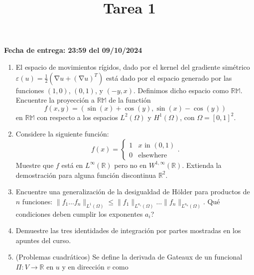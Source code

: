 \documentclass{article}
\title{Tarea 1}
\date{}
\DeclareMathOperator{\grad}{\nabla}
\newcommand{\R}{\mathbb{R}}
\begin{document}
\maketitle
\hfill \textbf{Fecha de entrega: 23:59 del 09/10/2024}
 

\begin{enumerate}
    \item El espacio de movimientos rígidos, dado por el kernel del gradiente simétrico $\varepsilon(u) = \frac 1 2 \left( \grad u + (\grad u)^T \right)$ está dado por el espacio generado por las funciones $(1,0)$, $(0,1)$, y $(-y, x)$. Definimos dicho espacio como $\mathbb{RM}$. Encuentre la proyección a $\mathbb{RM}$ de la functión 
        $$ f(x,y) = (\sin(x) + \cos(y), \sin(x) - \cos(y)) $$
    en $\mathbb{RM}$ con respecto a los espacios $L^2(\Omega)$ y $H^1(\Omega)$, con $\Omega=[0,1]^2$.
    \item Considere la siguiente función: 
        $$ f(x) = \begin{cases}
                        1 & \text{$x$ in $(0,1)$} \\
                        0 & \text{elsewhere}
                    \end{cases}. $$
    Muestre que $f$ está en $L^\infty(\R)$ pero no en $W^{1,\infty}(\R)$. Extienda la demostración para alguna función discontinua $\R^2$. 
    \item Encuentre una generalización de la desigualdad de Hölder para productos de $n$ funciones: $\| f_1 \hdots f_n \|_{L^1(\Omega)} \leq \| f_1\|_{L^{a_1}(\Omega)} \hdots \| f_n \|_{L^{a_n}(\Omega)}$. Qué condiciones deben cumplir los exponentes $a_i$? 
    \item Demuestre las tres identidades de integración por partes mostradas en los apuntes del curso.
    \item (Problemas cuadráticos) Se define la derivada de Gateaux de un funcional $\Pi: V \to \R$ en $u$ y en dirección $v$ como

\end{enumerate}
\end{document}
